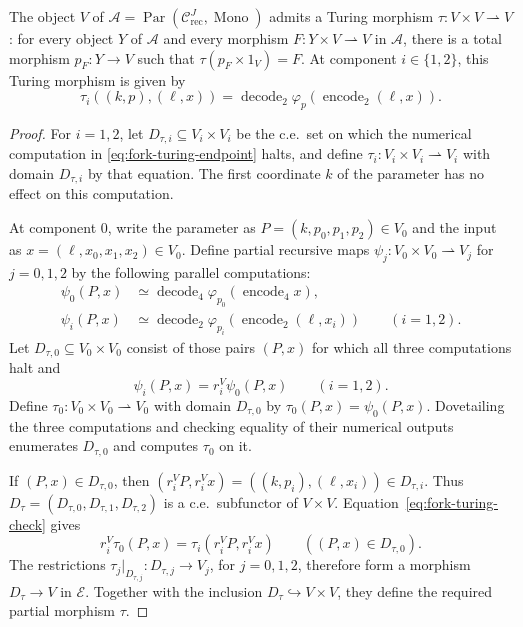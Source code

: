 \begin{theorem}\label{thm:fork-turing}
The object $V$ of
$\mathcal A=\operatorname{Par}(\mathcal C_{\mathrm{rec}}^J,
\operatorname{Mono})$ admits a Turing morphism
$\tau:V\times V\rightharpoonup V$: for every object $Y$ of
$\mathcal A$ and every morphism $F:Y\times V\rightharpoonup V$
in $\mathcal A$, there is a total morphism
$p_F:Y\to V$ such that $\tau(p_F\times1_V)=F$.
At component $i\in\{1,2\}$, this Turing morphism is given by
\begin{equation}\label{eq:fork-turing-endpoint}
 \tau_i((k,p),(\ell,x))
 =\operatorname{decode}_2
     \varphi_p(\operatorname{encode}_2(\ell,x)).
\end{equation}
\end{theorem}

\begin{proof}
For $i=1,2$, let $D_{\tau,i}\subseteq V_i\times V_i$ be the c.e.\ set
on which the numerical computation in
\eqref{eq:fork-turing-endpoint} halts, and define
$\tau_i:V_i\times V_i\rightharpoonup V_i$ with domain $D_{\tau,i}$
by that equation. The first coordinate $k$
of the parameter has no effect on this computation.

At component $0$, write the parameter as
$P=(k,p_0,p_1,p_2)\in V_0$ and the input as
$x=(\ell,x_0,x_1,x_2)\in V_0$.
Define partial recursive maps $\psi_j:V_0\times V_0\rightharpoonup V_j$
for $j=0,1,2$ by the following parallel computations:
\begin{align*}
 \psi_0(P,x)&\simeq
   \operatorname{decode}_4
      \varphi_{p_0}(\operatorname{encode}_4 x),\\
 \psi_i(P,x)&\simeq
   \operatorname{decode}_2
      \varphi_{p_i}(\operatorname{encode}_2(\ell,x_i))
      \qquad(i=1,2).
\end{align*}
Let $D_{\tau,0}\subseteq V_0\times V_0$ consist of those pairs $(P,x)$
for which all three computations halt and
\begin{equation}\label{eq:fork-turing-check}
 \psi_i(P,x)=r_i^V \psi_0(P,x)\qquad(i=1,2).
\end{equation}
Define $\tau_0:V_0\times V_0\rightharpoonup V_0$ with domain
$D_{\tau,0}$ by $\tau_0(P,x)=\psi_0(P,x)$.
Dovetailing the three computations and checking equality of their
numerical outputs enumerates $D_{\tau,0}$ and computes $\tau_0$ on it.

If $(P,x)\in D_{\tau,0}$, then
$(r_i^V P,r_i^V x)=((k,p_i),(\ell,x_i))\in D_{\tau,i}$.
Thus $D_\tau=(D_{\tau,0},D_{\tau,1},D_{\tau,2})$ is a c.e.\ subfunctor of $V\times V$.
Equation~\eqref{eq:fork-turing-check} gives
\[
 r_i^V\tau_0(P,x)
   =\tau_i(r_i^V P,r_i^V x)
 \qquad((P,x)\in D_{\tau,0}).
\]
The restrictions $\tau_j|_{D_{\tau,j}}:D_{\tau,j}\to V_j$, for $j=0,1,2$,
therefore form a morphism $D_\tau\to V$ in $\mathcal E$.
Together with the inclusion $D_\tau\hookrightarrow V\times V$,
they define the required partial morphism $\tau$.


\end{proof}

